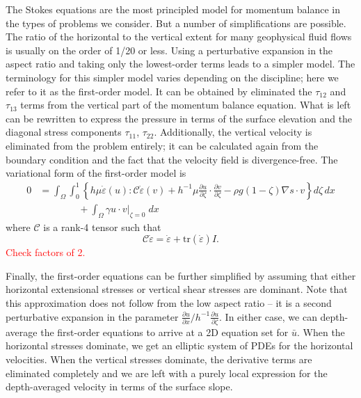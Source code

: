 \documentclass{article}
\theoremstyle{definition}
\theoremstyle{plain}
\begin{document}
The Stokes equations are the most principled model for momentum balance in the types of problems we consider.
But a number of simplifications are possible.
The ratio of the horizontal to the vertical extent for many geophysical fluid flows is usually on the order of 1/20 or less.
Using a perturbative expansion in the aspect ratio and taking only the lowest-order terms leads to a simpler model.
The terminology for this simpler model varies depending on the discipline; here we refer to it as the first-order model.
It can be obtained by eliminated the $\tau_{12}$ and $\tau_{13}$ terms from the vertical part of the momentum balance equation.
What is left can be rewritten to express the pressure in terms of the surface elevation and the diagonal stress components $\tau_{11}$, $\tau_{22}$.
Additionally, the vertical velocity is eliminated from the problem entirely; it can be calculated again from the boundary condition and the fact that the velocity field is divergence-free.
The variational form of the first-order model is
\begin{align}
    0 & = \int_\Omega\int_0^1\left\{h\mu\dot\varepsilon(u) :\mathscr{C}\dot\varepsilon(v) + h^{-1}\mu\frac{\partial u}{\partial\zeta}\cdot\frac{\partial v}{\partial\zeta} - \rho g(1 - \zeta)\nabla s\cdot v\right\}d\zeta\,dx \nonumber\\
    & \qquad\qquad + \int_\Omega \gamma u\cdot v\big|_{\zeta = 0}\;dx
\end{align}
where $\mathscr{C}$ is a rank-4 tensor such that
\begin{equation}
    \mathscr{C}\dot\varepsilon = \dot\varepsilon + \text{tr}(\dot\varepsilon)I.
\end{equation}
\textcolor{red}{Check factors of 2.}

Finally, the first-order equations can be further simplified by assuming that either horizontal extensional stresses or vertical shear stresses are dominant.
Note that this approximation does not follow from the low aspect ratio -- it is a second perturbative expansion in the parameter $\frac{\partial u}{\partial x} / h^{-1}\frac{\partial u}{\partial\zeta}$.
In either case, we can depth-average the first-order equations to arrive at a 2D equation set for $\bar u$.
When the horizontal stresses dominate, we get an elliptic system of PDEs for the horizontal velocities.
When the vertical stresses dominate, the derivative terms are eliminated completely and we are left with a purely local expression for the depth-averaged velocity in terms of the surface slope.
\end{document}
